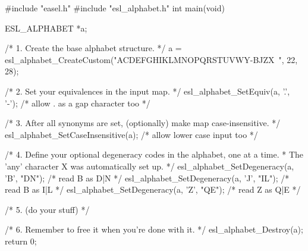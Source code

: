 \begin{cchunk}
#include "easel.h"
#include "esl_alphabet.h"
int main(void)
{ 
  ESL_ALPHABET *a;

  /* 1. Create the base alphabet structure. */
  a = esl_alphabet_CreateCustom("ACDEFGHIKLMNOPQRSTUVWY-BJZX~", 22, 28);

  /* 2. Set your equivalences in the input map.  */
  esl_alphabet_SetEquiv(a, '.', '-');     /* allow . as a gap character too */

  /* 3. After all synonyms are set, (optionally) make map case-insensitive. */
  esl_alphabet_SetCaseInsensitive(a);       /* allow lower case input too */

  /* 4. Define your optional degeneracy codes in the alphabet, one at a time.
   *    The 'any' character X was automatically set up.  */
  esl_alphabet_SetDegeneracy(a, 'B', "DN"); /* read B as {D|N} */
  esl_alphabet_SetDegeneracy(a, 'J', "IL"); /* read B as {I|L} */
  esl_alphabet_SetDegeneracy(a, 'Z', "QE"); /* read Z as {Q|E} */

  /* 5. (do your stuff) */

  /* 6. Remember to free it when you're done with it. */
  esl_alphabet_Destroy(a);
  return 0;
}
\end{cchunk}
